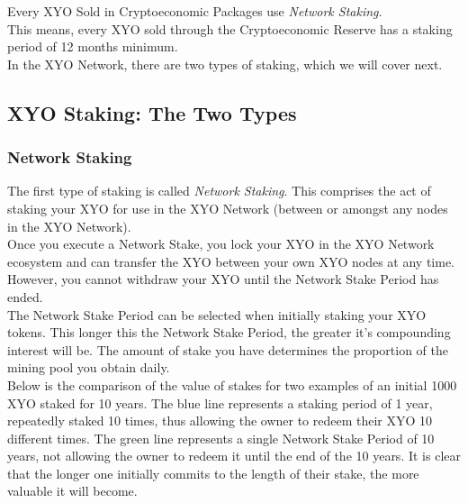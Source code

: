 \documentclass{article}
\begin{document}
Every XYO Sold in Cryptoeconomic Packages use \textit{Network Staking}.\\

This means, every XYO sold through the Cryptoeconomic Reserve has a staking period of 12 months minimum.\\

In the XYO Network, there are two types of staking, which we will cover next.

\subsection{XYO Staking: The Two Types}

\subsubsection{Network Staking}

The first type of staking is called \textit{Network Staking}. This comprises the act of staking your XYO for use in the XYO Network (between or amongst any nodes in the XYO Network).\\

Once you execute a Network Stake, you lock your XYO in the XYO Network ecosystem and can transfer the XYO between your own XYO nodes at any time. However, you cannot withdraw your XYO until the Network Stake Period has ended.\\

The Network Stake Period can be selected when initially staking your XYO tokens. This longer this the Network Stake Period, the greater it's compounding interest will be. The amount of stake you have determines the proportion of the mining pool you obtain daily.\\



Below is the comparison of the value of stakes for two examples of an initial 1000 XYO staked for 10 years. The blue line represents a staking period of 1 year, repeatedly staked 10 times, thus allowing the owner to redeem their XYO 10 different times. The green line represents a single Network Stake Period of 10 years, not allowing the owner to redeem it until the end of the 10 years. It is clear that the longer one initially commits to the length of their stake, the more valuable it will become.
\end{document}
